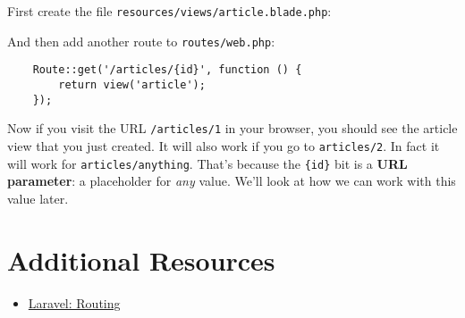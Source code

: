 First create the file \texttt{resources/views/article.blade.php}:


And then add another route to \texttt{routes/web.php}:

\begin{verbatim}
    Route::get('/articles/{id}', function () {
        return view('article');
    });
\end{verbatim}

Now if you visit the URL \texttt{/articles/1} in your browser, you should see the article view that you just created. It will also work if you go to \texttt{articles/2}. In fact it will work for \texttt{articles/anything}. That's because the \texttt{\{id\}} bit is a \textbf{URL parameter}: a placeholder for \textit{any} value. We'll look at how we can work with this value later.

\section{Additional Resources}

\begin{itemize}[leftmargin=*]
    \item \href{http://laravel.com/docs/master/routing}{Laravel: Routing}
\end{itemize}

